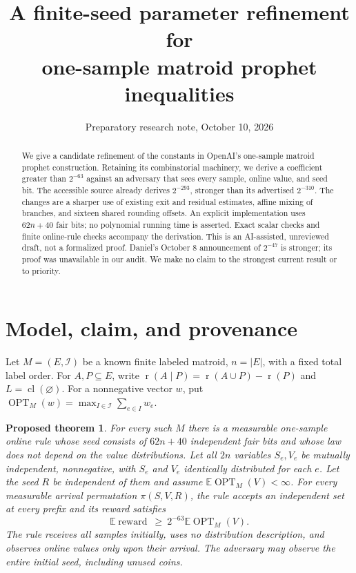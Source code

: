 \documentclass[11pt]{article}
\title{A finite-seed parameter refinement for\protect\\one-sample matroid prophet inequalities}
\author{}
\date{Preparatory research note, October 10, 2026}
\newtheorem{theorem}{Proposed theorem}
\DeclareMathOperator{\cl}{cl}
\DeclareMathOperator{\rk}{r}
\DeclareMathOperator{\OPT}{OPT}
\newcommand{\E}{\mathbb E}
\begin{document}
\maketitle
\begin{abstract}
We give a candidate refinement of the constants in OpenAI's one-sample
matroid prophet construction. Retaining its combinatorial machinery,
we derive a coefficient greater than $2^{-63}$ against an adversary
that sees every sample, online value, and seed bit. The accessible source
already derives $2^{-293}$, stronger than its advertised $2^{-310}$.
The changes are a sharper use of existing exit and residual estimates,
affine mixing of branches, and sixteen shared rounding offsets. An
explicit implementation uses $62n+40$ fair bits; no polynomial running
time is asserted. Exact scalar checks and finite online-rule checks
accompany the derivation. This is an AI-assisted, unreviewed draft,
not a formalized proof. Daniel's October 8 announcement of $2^{-47}$
is stronger; its proof was unavailable in our audit. We make no claim
to the strongest current result or to priority.
\end{abstract}

\section{Model, claim, and provenance}

Let $M=(E,\mathcal I)$ be a known finite labeled matroid, $n=|E|$,
with a fixed total label order. For $A,P\subseteq E$, write
$\rk(A\mid P)=\rk(A\cup P)-\rk(P)$ and $L=\cl(\varnothing)$.
For a nonnegative vector $w$, put
$\OPT_M(w)=\max_{I\in\mathcal I}\sum_{e\in I}w_e$.

\begin{theorem}\label{thm:main}
For every such $M$ there is a measurable one-sample online rule whose
seed consists of $62n+40$ independent fair bits and whose law does not
depend on the value distributions. Let all $2n$ variables $S_e,V_e$
be mutually independent, nonnegative, with $S_e$ and $V_e$ identically
distributed for each $e$. Let the seed $R$ be independent of them and
assume $\E\OPT_M(V)<\infty$. For every measurable arrival permutation
$\pi(S,V,R)$, the rule accepts an independent set at every prefix and
its reward satisfies
\[
 \E\operatorname{reward}\ \ge\ 2^{-63}\E\OPT_M(V).
\]
The rule receives all samples initially, uses no distribution description,
and observes online values only upon their arrival. The adversary may
observe the entire initial seed, including unused coins.
\end{theorem}
\end{document}
